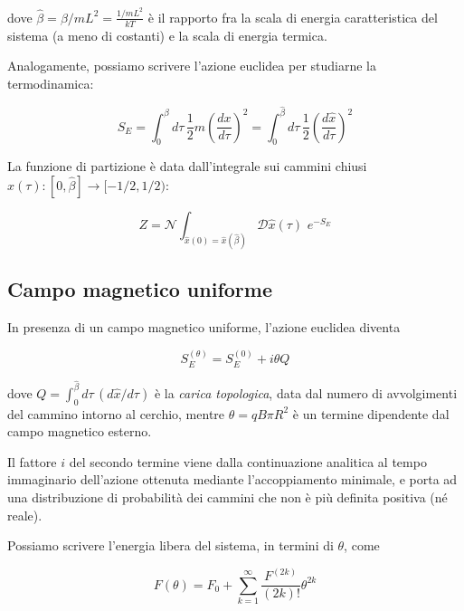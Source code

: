 \documentclass[a4paper,11pt]{article}
\begin{document}
    dove $\hat{\beta} = \beta / mL^2 = \frac{1/mL^2}{kT}$ è il rapporto fra la scala di energia caratteristica del sistema (a meno di costanti) e la scala di energia termica.

    
    Analogamente, possiamo scrivere l'azione euclidea per studiarne la termodinamica:
    
    \begin{equation}
        S_E = \int_0^\beta d\tau \, \frac{1}{2} m \left(\frac{dx}{d\tau}\right)^2 = \int_0^{\hat{\beta}} d\tau \, \frac{1}{2} \left( \frac{d\hat{x}}{d\tau}\right)^2
    \end{equation}
    
    
    
    La funzione di partizione è data dall'integrale sui cammini chiusi $\hat{x}(\tau): [0, \hat{\beta}] \to [-1/2, 1/2)$:
    
    \begin{equation}
        Z = \mathcal{N} \int_{\hat{x}(0) = \hat{x}(\hat{\beta})} \mathcal{D}\hat{x}(\tau) \, \,e^{-S_E}
    \end{equation}

    \subsection{Campo magnetico uniforme}
    In presenza di un campo magnetico uniforme, l'azione euclidea diventa
    
    \begin{equation}
        S^{(\theta)}_E = S^{(0)}_E + i\theta Q
    \end{equation}
    
    dove $Q = \int_0^{\hat{\beta}} d\tau \, ({d\hat{x}} / {d\tau})$ è la \emph{carica topologica}, data dal numero di avvolgimenti del cammino intorno al cerchio, mentre $\theta = qB\pi R^2$ è un termine dipendente dal campo magnetico esterno. 
    
    Il fattore $i$ del secondo termine viene dalla continuazione analitica al tempo immaginario dell'azione ottenuta mediante l'accoppiamento minimale, e porta ad una distribuzione di probabilità dei cammini che non è più definita positiva (né reale). 
    
    Possiamo scrivere l'energia libera del sistema, in termini di $\theta$, come
    
    \begin{equation}
        F(\theta) = F_0 + \sum_{k=1}^{\infty} \frac{F^{(2k)}}{(2k)!} \theta^{2k}
    \end{equation}
    
\end{document}
